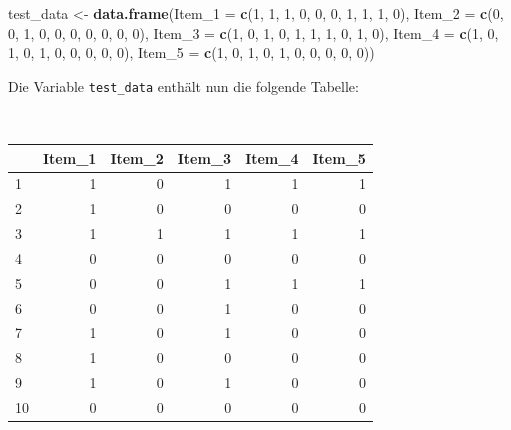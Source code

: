 \documentclass[12pt,]{tufte-book}
\newenvironment{Shaded}{\begin{snugshade}}{\end{snugshade}}
\newcommand{\KeywordTok}[1]{\textcolor[rgb]{0.13,0.29,0.53}{\textbf{#1}}}
\newcommand{\DataTypeTok}[1]{\textcolor[rgb]{0.13,0.29,0.53}{#1}}
\newcommand{\DecValTok}[1]{\textcolor[rgb]{0.00,0.00,0.81}{#1}}
\newcommand{\StringTok}[1]{\textcolor[rgb]{0.31,0.60,0.02}{#1}}
\newcommand{\NormalTok}[1]{#1}
\theoremstyle{definition}
\theoremstyle{definition}
\theoremstyle{definition}
\theoremstyle{remark}
\begin{document}
\begin{Shaded}
\begin{Highlighting}[]
\NormalTok{test_data <-}\StringTok{ }\KeywordTok{data.frame}\NormalTok{(}\DataTypeTok{Item_1 =} \KeywordTok{c}\NormalTok{(}\DecValTok{1}\NormalTok{, }\DecValTok{1}\NormalTok{, }\DecValTok{1}\NormalTok{, }\DecValTok{0}\NormalTok{, }
    \DecValTok{0}\NormalTok{, }\DecValTok{0}\NormalTok{, }\DecValTok{1}\NormalTok{, }\DecValTok{1}\NormalTok{, }\DecValTok{1}\NormalTok{, }\DecValTok{0}\NormalTok{), }\DataTypeTok{Item_2 =} \KeywordTok{c}\NormalTok{(}\DecValTok{0}\NormalTok{, }\DecValTok{0}\NormalTok{, }\DecValTok{1}\NormalTok{, }\DecValTok{0}\NormalTok{, }
    \DecValTok{0}\NormalTok{, }\DecValTok{0}\NormalTok{, }\DecValTok{0}\NormalTok{, }\DecValTok{0}\NormalTok{, }\DecValTok{0}\NormalTok{, }\DecValTok{0}\NormalTok{), }\DataTypeTok{Item_3 =} \KeywordTok{c}\NormalTok{(}\DecValTok{1}\NormalTok{, }\DecValTok{0}\NormalTok{, }\DecValTok{1}\NormalTok{, }\DecValTok{0}\NormalTok{, }
    \DecValTok{1}\NormalTok{, }\DecValTok{1}\NormalTok{, }\DecValTok{1}\NormalTok{, }\DecValTok{0}\NormalTok{, }\DecValTok{1}\NormalTok{, }\DecValTok{0}\NormalTok{), }\DataTypeTok{Item_4 =} \KeywordTok{c}\NormalTok{(}\DecValTok{1}\NormalTok{, }\DecValTok{0}\NormalTok{, }\DecValTok{1}\NormalTok{, }\DecValTok{0}\NormalTok{, }
    \DecValTok{1}\NormalTok{, }\DecValTok{0}\NormalTok{, }\DecValTok{0}\NormalTok{, }\DecValTok{0}\NormalTok{, }\DecValTok{0}\NormalTok{, }\DecValTok{0}\NormalTok{), }\DataTypeTok{Item_5 =} \KeywordTok{c}\NormalTok{(}\DecValTok{1}\NormalTok{, }\DecValTok{0}\NormalTok{, }\DecValTok{1}\NormalTok{, }\DecValTok{0}\NormalTok{, }
    \DecValTok{1}\NormalTok{, }\DecValTok{0}\NormalTok{, }\DecValTok{0}\NormalTok{, }\DecValTok{0}\NormalTok{, }\DecValTok{0}\NormalTok{, }\DecValTok{0}\NormalTok{))}
\end{Highlighting}
\end{Shaded}

Die Variable \texttt{test\_data} enthält nun die folgende Tabelle:

~

\begin{tabular}{l|r|r|r|r|r}
\hline
  & Item\_1 & Item\_2 & Item\_3 & Item\_4 & Item\_5\\
\hline
1 & 1 & 0 & 1 & 1 & 1\\
\hline
2 & 1 & 0 & 0 & 0 & 0\\
\hline
3 & 1 & 1 & 1 & 1 & 1\\
\hline
4 & 0 & 0 & 0 & 0 & 0\\
\hline
5 & 0 & 0 & 1 & 1 & 1\\
\hline
6 & 0 & 0 & 1 & 0 & 0\\
\hline
7 & 1 & 0 & 1 & 0 & 0\\
\hline
8 & 1 & 0 & 0 & 0 & 0\\
\hline
9 & 1 & 0 & 1 & 0 & 0\\
\hline
10 & 0 & 0 & 0 & 0 & 0\\
\hline
\end{tabular}
\end{document}
